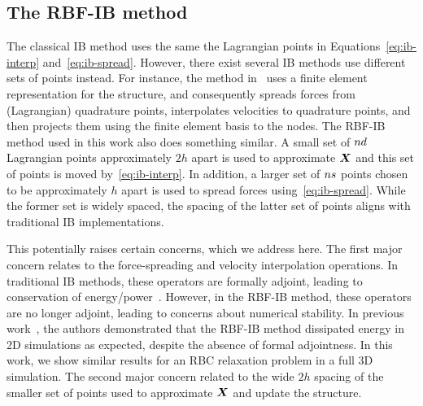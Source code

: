 \subsection{The RBF-IB method}
\label{sec:rbfib}
The classical IB method uses the same the Lagrangian points in Equations~\eqref{eq:ib-interp} and~\eqref{eq:ib-spread}. However, there exist several IB methods
use different sets of points instead. For instance, the method in~\cite{Griffith:2017id} uses a finite element representation for the structure, and consequently spreads forces from (Lagrangian)
quadrature points, interpolates velocities to quadrature points, and then projects them using the finite element basis to the nodes. The RBF-IB method used in this work also does something similar. A small set of $\data\cardinality$ Lagrangian points approximately $2h$ apart is used to approximate $\boldsymbol{X}$ and this set of points is moved by~\eqref{eq:ib-interp}. In addition, a larger set of $\sample\cardinality$ points chosen to be approximately $h$ apart is used to spread forces using~\eqref{eq:ib-spread}. While the former set is widely spaced, the spacing of the latter set of points aligns with traditional IB implementations.

This potentially raises certain concerns, which we address here. The first major concern relates to the force-spreading and velocity interpolation operations. In traditional IB methods, these operators are formally adjoint, leading to conservation of energy/power~\cite{peskin:2002}. However, in the RBF-IB method, these operators are no longer adjoint, leading to concerns about numerical stability. In previous work~\cite{Shankar2015:km}, the authors demonstrated that the RBF-IB method dissipated energy in 2D simulations as expected, despite the absence of formal adjointness. In this work, we show similar results for an RBC relaxation problem in a full 3D simulation. The second major concern related to the wide $2h$ spacing of the smaller set of points used to approximate $\boldsymbol{X}$ and update the structure. 


